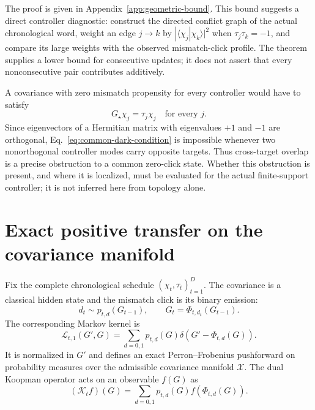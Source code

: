 \documentclass[
  aps,prx,twocolumn,superscriptaddress,longbibliography,
  nofootinbib,floatfix
]{revtex4-2}
\newcommand{\cK}{\mathcal{K}}
\newcommand{\cL}{\mathcal{L}}
\newcommand{\cX}{\mathcal{X}}
\theoremstyle{plain}
\theoremstyle{definition}
\begin{document}
The proof is given in Appendix~\ref{app:geometric-bound}.  This bound suggests a
direct controller diagnostic: construct the directed conflict graph of the
actual chronological word, weight an edge \(j\to k\) by
\(|\langle\chi_j|\chi_k\rangle|^2\) when \(\tau_j\tau_k=-1\), and compare its
large weights with the observed mismatch-click profile.  The theorem supplies
a lower bound for consecutive updates; it does not assert that every
nonconsecutive pair contributes additively.

A covariance with zero mismatch propensity for every controller would have to
satisfy
\begin{equation}
 G_\star\chi_j=\tau_j\chi_j
 \quad\text{for every }j.
 \label{eq:common-dark-condition}
\end{equation}
Since eigenvectors of a Hermitian matrix with eigenvalues \(+1\) and \(-1\)
are orthogonal, Eq.~\eqref{eq:common-dark-condition} is impossible whenever
two nonorthogonal controller modes carry opposite targets.  Thus cross-target
overlap is a precise obstruction to a common zero-click state.  Whether this
obstruction is present, and where it is localized, must be evaluated for the
actual finite-support controller; it is not inferred here from topology alone.

\section[Positive covariance-manifold transfer]
{Exact positive transfer on the covariance manifold}
\label{sec:covariance-transfer}

Fix the complete chronological schedule
\((\chi_t,\tau_t)_{t=1}^{D}\).  The covariance is a classical hidden state and
the mismatch click is its binary emission:
\begin{equation}
 d_t\sim p_{t,d}(G_{t-1}),
 \qquad
 G_t=\Phi_{t,d_t}(G_{t-1}).
 \label{eq:hidden-Markov-process}
\end{equation}
The corresponding Markov kernel is
\begin{equation}
 \cL_{t,1}(G',G)
 =\sum_{d=0,1}p_{t,d}(G)
 \delta\!\left(G'-\Phi_{t,d}(G)\right).
 \label{eq:physical-PF-kernel}
\end{equation}
It is normalized in \(G'\) and defines an exact Perron--Frobenius pushforward
on probability measures over the admissible covariance manifold \(\cX\).
The dual Koopman operator acts on an observable \(f(G)\) as
\begin{equation}
 (\cK_t f)(G)
 =\sum_{d=0,1}p_{t,d}(G)f\!\left(\Phi_{t,d}(G)\right).
 \label{eq:Koopman-map}
\end{equation}
\end{document}
